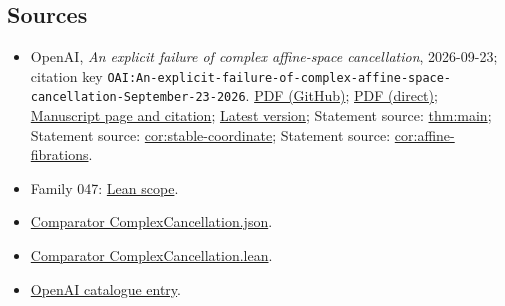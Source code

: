 \documentclass[11pt]{article}
\begin{document}
\subsection{Sources}
\begin{itemize}
\item OpenAI, \emph{An explicit failure of complex affine-space cancellation}, 2026-09-23; citation key \texttt{OAI:An-explicit-failure-of-complex-affine-space-cancellation-September-23-2026}. \href{https://github.com/openai/math/blob/adc7f1241b42e322a6451854ab7e4b4c146bf78a/preprints/An-explicit-failure-of-complex-affine-space-cancellation-September-23-2026/paper.pdf}{PDF (GitHub)}; \href{https://github.com/openai/math/raw/adc7f1241b42e322a6451854ab7e4b4c146bf78a/preprints/An-explicit-failure-of-complex-affine-space-cancellation-September-23-2026/paper.pdf}{PDF (direct)}; \href{https://github.com/openai/math/blob/adc7f1241b42e322a6451854ab7e4b4c146bf78a/preprints/An-explicit-failure-of-complex-affine-space-cancellation-September-23-2026/README.md}{Manuscript page and citation}; \href{https://github.com/openai/math/blob/main/preprints/An-explicit-failure-of-complex-affine-space-cancellation-September-23-2026/paper.pdf}{Latest version}; Statement source: \href{https://github.com/openai/math/blob/adc7f1241b42e322a6451854ab7e4b4c146bf78a/preprints/An-explicit-failure-of-complex-affine-space-cancellation-September-23-2026/build/sections/01-introduction.tex\#L59}{thm:main}; Statement source: \href{https://github.com/openai/math/blob/adc7f1241b42e322a6451854ab7e4b4c146bf78a/preprints/An-explicit-failure-of-complex-affine-space-cancellation-September-23-2026/build/sections/01-introduction.tex\#L90}{cor:stable-coordinate}; Statement source: \href{https://github.com/openai/math/blob/adc7f1241b42e322a6451854ab7e4b4c146bf78a/preprints/An-explicit-failure-of-complex-affine-space-cancellation-September-23-2026/build/sections/07-affine-fibrations.tex\#L8}{cor:affine-fibrations}.
\item Family 047: \href{https://github.com/openai/math/blob/adc7f1241b42e322a6451854ab7e4b4c146bf78a/lean/docs/047.md}{Lean scope}.
\item \href{https://github.com/openai/math/blob/adc7f1241b42e322a6451854ab7e4b4c146bf78a/lean/ComparatorChallenges/ComplexCancellation.json}{Comparator ComplexCancellation.json}.
\item \href{https://github.com/openai/math/blob/adc7f1241b42e322a6451854ab7e4b4c146bf78a/lean/ComparatorChallenges/ComplexCancellation.lean}{Comparator ComplexCancellation.lean}.
\item \href{https://github.com/openai/math/blob/adc7f1241b42e322a6451854ab7e4b4c146bf78a/CONTENTS.md}{OpenAI catalogue entry}.
\end{itemize}
\end{document}

